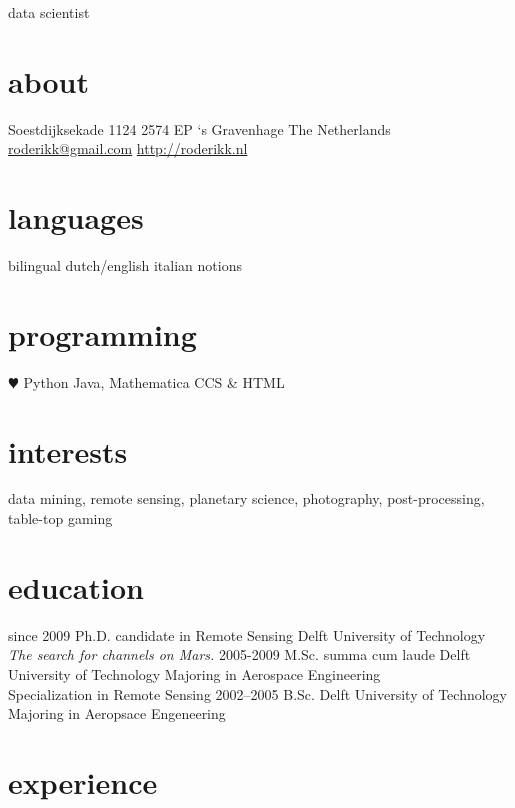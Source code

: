 \documentclass[]{friggeri-cv}
\begin{document}
       {data scientist}


\begin{aside}
  \section{about}
    Soestdijksekade 1124
    2574 EP `s Gravenhage
    The Netherlands
    ~
    \href{mailto:roderikk@gmail.com}{roderikk@gmail.com}
    \href{http://roderikk.nl}{http://roderikk.nl}
  \section{languages}
    bilingual dutch/english
    italian notions
  \section{programming}
    {\color{red} $\varheartsuit$} Python
    Java, Mathematica    
    CCS \& HTML
\end{aside}

\section{interests}

data mining,
remote sensing,
planetary science,
photography,
post-processing,
table-top gaming

\section{education}

\begin{entrylist}
  \entry
    {since 2009}
    {Ph.D. {\normalfont candidate in Remote Sensing}}
    {Delft University of Technology}
    {\emph{The search for channels on Mars.}}
  \entry
    {2005-2009}
    {M.Sc. summa cum laude}
    {Delft University of Technology}
    {Majoring in Aerospace Engineering\\
    Specialization in Remote Sensing}
  \entry
    {2002–2005}
    {B.Sc.}
    {Delft University of Technology}
    {Majoring in Aeropsace Engeneering}
\end{entrylist}

\section{experience}
\end{document}
